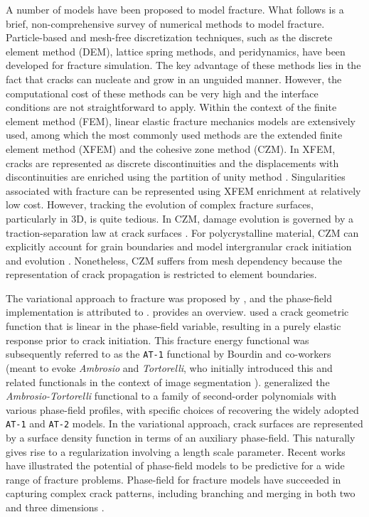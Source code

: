 A number of models have been proposed to model fracture. What follows is a brief, non-comprehensive survey of numerical methods to model fracture. Particle-based and mesh-free discretization techniques, such as the discrete element method (DEM), lattice spring methods, and peridynamics, have been developed for fracture simulation. The key advantage of these methods lies in the fact that cracks can nucleate and grow in an unguided manner. However, the computational cost of these methods can be very high and the interface conditions are not straightforward to apply. Within the context of the finite element method (FEM), linear elastic fracture mechanics models are extensively used, among which the most commonly used methods are the extended finite element method (XFEM) and the cohesive zone method (CZM). In XFEM, cracks are represented as discrete discontinuities and the displacements with discontinuities are enriched using the partition of unity method \cite{babuaka1997, Dolbow99}. Singularities associated with fracture can be represented using XFEM enrichment at relatively low cost. However, tracking the evolution of complex fracture surfaces, particularly in 3D, is quite tedious. In CZM, damage evolution is governed by a traction-separation law at crack surfaces \cite{needleman_1992, ortiz_1999}. For polycrystalline material, CZM can explicitly account for grain boundaries and model intergranular crack initiation and evolution \cite{KAMAYA2007, KAMAYA2009}. Nonetheless, CZM suffers from mesh dependency because the representation of crack propagation is restricted to element boundaries.

The variational approach to fracture was proposed by \citet{Francfort98}, and the phase-field implementation is attributed to \citet{Bourdin2000}.
\citet{bourdin2008variational} provides an overview.
\citet{pham2013onset} used a crack geometric function that is linear in the phase-field variable, resulting in a purely elastic response prior to crack initiation.  This fracture energy functional was subsequently referred to as the \texttt{AT-1} functional by Bourdin and co-workers (meant to evoke \textit{Ambrosio} and \textit{Tortorelli}, who initially introduced this and related functionals in the context of image segmentation \cite{ambrosio1990approximation}). \citet{wu2017unified} generalized the \textit{Ambrosio-Tortorelli} functional \cite{ambrosio1990approximation} to a family of second-order polynomials with various phase-field profiles, with specific choices of recovering the widely adopted \texttt{AT-1} and \texttt{AT-2} models.
In the variational approach, crack surfaces are represented by a surface density function in terms of an auxiliary phase-field. This naturally gives rise to a regularization involving a length scale parameter. Recent works have illustrated the potential of phase-field models to be predictive for a wide range of fracture problems. Phase-field for fracture models have succeeded in capturing complex crack patterns, including branching and merging in both two and three dimensions \cite{karma_2001, karma_2004, henry_2004, spatschek_2007, amor_2009}.

